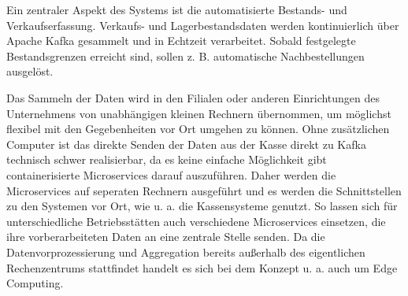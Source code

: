 \documentclass[%
pdftex,
oneside,			%
11pt,				%
parskip=half,		%
headheight = 12pt,	%
headsepline,		%
footsepline,		%
footheight = 16pt,	%
abstracton,		%
DIV=calc,		%
BCOR=8mm,		%
headinclude=false,	%
footinclude=false,	%
listof=totoc,		%
toc=bibliography,	%
]{scrreprt}	%
\begin{document}


    Ein zentraler Aspekt des Systems ist die automatisierte Bestands- und Verkaufserfassung.
    Verkaufs- und Lagerbestandsdaten werden kontinuierlich über Apache Kafka gesammelt und in Echtzeit verarbeitet.
    Sobald festgelegte Bestandsgrenzen erreicht sind, sollen z. B. automatische Nachbestellungen ausgelöst.

    Das Sammeln der Daten wird in den Filialen oder anderen Einrichtungen des Unternehmens von unabhängigen kleinen Rechnern übernommen, um möglichst flexibel mit den Gegebenheiten vor Ort umgehen zu können.
    Ohne zusätzlichen Computer ist das direkte Senden der Daten aus der Kasse direkt zu Kafka technisch schwer realisierbar, da es keine einfache Möglichkeit gibt containerisierte Microservices darauf auszuführen.
    Daher werden die Microservices auf seperaten Rechnern ausgeführt und es werden die Schnittstellen zu den Systemen vor Ort, wie u. a. die Kassensysteme genutzt.
    So lassen sich für unterschiedliche Betriebsstätten auch verschiedene Microservices einsetzen, die ihre vorberarbeiteten Daten an eine zentrale Stelle senden.
    Da die Datenvorprozessierung und Aggregation bereits außerhalb des eigentlichen Rechenzentrums stattfindet handelt es sich bei dem Konzept u. a. auch um Edge Computing.
\end{document}
